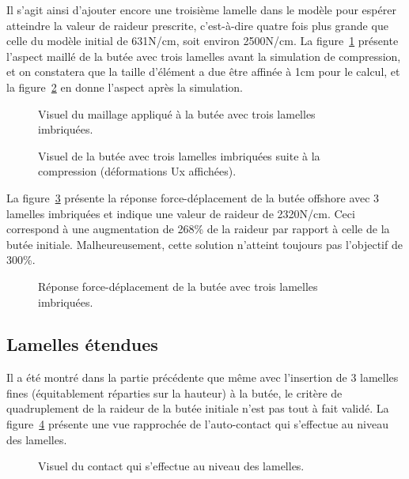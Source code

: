 ﻿\documentclass{article}
\begin{document}
Il s'agit ainsi d'ajouter encore une troisième lamelle dans le modèle pour espérer atteindre la valeur de raideur prescrite, c'est-à-dire quatre fois plus grande que celle du modèle initial de 631N/cm, soit environ 2500N/cm. La figure~\ref{fig13} présente l'aspect maillé de la butée avec trois lamelles avant la simulation de compression, et on constatera que la taille d'élément a due être affinée à 1cm pour le calcul, et la figure~\ref{fig14} en donne l'aspect après la simulation.

\begin{figure}[!h]
	\centering
	\caption{Visuel du maillage appliqué à la butée avec trois lamelles imbriquées.}
	\label{fig13}
\end{figure}

\begin{figure}[!h]
	\centering
	\caption{Visuel de la butée avec trois lamelles imbriquées suite à la compression (déformations Ux affichées).}
	\label{fig14}
\end{figure}

La figure~\ref{fig15} présente la réponse force-déplacement de la butée offshore avec 3 lamelles imbriquées et indique une valeur de raideur de 2320N/cm. Ceci correspond à une augmentation de 268\% de la raideur par rapport à celle de la butée initiale. Malheureusement, cette solution n'atteint toujours pas l'objectif de 300\%.
 
\begin{figure}[!h]
	\centering
	\caption{Réponse force-déplacement de la butée avec trois lamelles imbriquées.}
	\label{fig15}
\end{figure}

\subsection{Lamelles étendues}
Il a été montré dans la partie précédente que même avec l'insertion de 3 lamelles fines (équitablement réparties sur la hauteur) à la butée, le critère de quadruplement de la raideur de la butée initiale n'est pas tout à fait validé. La figure~\ref{fig16} présente une vue rapprochée de l'auto-contact qui s'effectue au niveau des lamelles.

\begin{figure}[!h]
	\centering
	\caption{Visuel du contact qui s'effectue au niveau des lamelles.}
	\label{fig16}
\end{figure}
\end{document}
